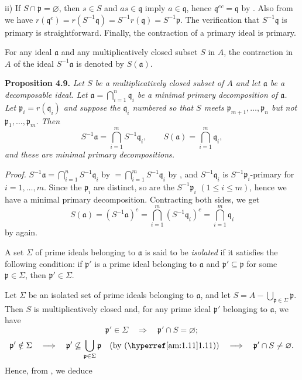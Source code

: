 ii) If \(S\cap\mathfrak p=\varnothing\), then \(s\in S\) and \(as\in\mathfrak q\) imply \(a\in\mathfrak q\), hence \(\mathfrak q^{ec}=\mathfrak q\) by . Also from  we have \(r(\mathfrak q^e)=r(S^{-1}\mathfrak q)=S^{-1}r(\mathfrak q)=S^{-1}\mathfrak p\). The verification that \(S^{-1}\mathfrak q\) is primary is straightforward. Finally, the contraction of a primary ideal is primary. \proofbox

For any ideal \(\mathfrak a\) and any multiplicatively closed subset \(S\) in \(A\), the contraction in \(A\) of the ideal \(S^{-1}\mathfrak a\) is denoted by \(S(\mathfrak a)\).

\noindent\textbf{Proposition 4.9.} \emph{Let \(S\) be a multiplicatively closed subset of \(A\) and let \(\mathfrak a\) be a decomposable ideal. Let \(\mathfrak a=\bigcap_{i=1}^n\mathfrak q_i\) be a minimal primary decomposition of \(\mathfrak a\). Let \(\mathfrak p_i=r(\mathfrak q_i)\) and suppose the \(\mathfrak q_i\) numbered so that \(S\) meets \(\mathfrak p_{m+1},\ldots,\mathfrak p_n\) but not \(\mathfrak p_1,\ldots,\mathfrak p_m\). Then}
\[
S^{-1}\mathfrak a=\bigcap_{i=1}^mS^{-1}\mathfrak q_i,
\qquad
S(\mathfrak a)=\bigcap_{i=1}^m\mathfrak q_i,
\]
\emph{and these are minimal primary decompositions.}

\noindent\emph{Proof.} \(S^{-1}\mathfrak a=\bigcap_{i=1}^nS^{-1}\mathfrak q_i\) by  \(=\bigcap_{i=1}^mS^{-1}\mathfrak q_i\) by , and \(S^{-1}\mathfrak q_i\) is \(S^{-1}\mathfrak p_i\)-primary for \(i=1,\ldots,m\). Since the \(\mathfrak p_i\) are distinct, so are the \(S^{-1}\mathfrak p_i\) \((1\leq i\leq m)\), hence we have a minimal primary decomposition. Contracting both sides, we get
\[
S(\mathfrak a)=(S^{-1}\mathfrak a)^c=\bigcap_{i=1}^m(S^{-1}\mathfrak q_i)^c=\bigcap_{i=1}^m\mathfrak q_i
\]
by  again. \proofbox

A set \(\Sigma\) of prime ideals belonging to \(\mathfrak a\) is said to be \emph{isolated} if it satisfies the following condition: if \(\mathfrak p'\) is a prime ideal belonging to \(\mathfrak a\) and \(\mathfrak p'\subseteq\mathfrak p\) for some \(\mathfrak p\in\Sigma\), then \(\mathfrak p'\in\Sigma\).

Let \(\Sigma\) be an isolated set of prime ideals belonging to \(\mathfrak a\), and let \(S=A-\bigcup_{\mathfrak p\in\Sigma}\mathfrak p\). Then \(S\) is multiplicatively closed and, for any prime ideal \(\mathfrak p'\) belonging to \(\mathfrak a\), we have
\[
\mathfrak p'\in\Sigma\quad\Longrightarrow\quad\mathfrak p'\cap S=\varnothing;
\]
\[
\mathfrak p'\notin\Sigma\quad\Longrightarrow\quad\mathfrak p'\not\subseteq\bigcup_{\mathfrak p\in\Sigma}\mathfrak p\quad\text{(by \amref{1.11})}\quad\Longrightarrow\quad\mathfrak p'\cap S\neq\varnothing.
\]
Hence, from , we deduce


